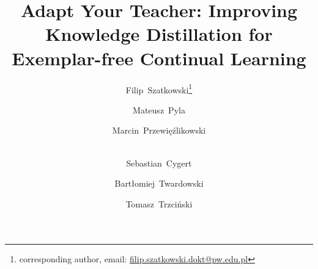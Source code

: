 \documentclass[10pt,twocolumn,letterpaper]{article}
\begin{document}
\title{Adapt Your Teacher: Improving Knowledge Distillation for Exemplar-free Continual Learning}

\author[1,2]{Filip~Szatkowski\thanks{corresponding author, email: \href{mailto:filip.szatkowski.dokt@pw.edu.pl}{filip.szatkowski.dokt@pw.edu.pl}}}
\author[2,3,4]{Mateusz~Pyla}
\author[2,3,4]{Marcin~Przewięźlikowski}
\author[2,5]{\\Sebastian~Cygert}
\author[2,6,7]{Bartłomiej~Twardowski}
\author[1,2,8]{Tomasz~Trzciński}

\maketitle

\end{document}
